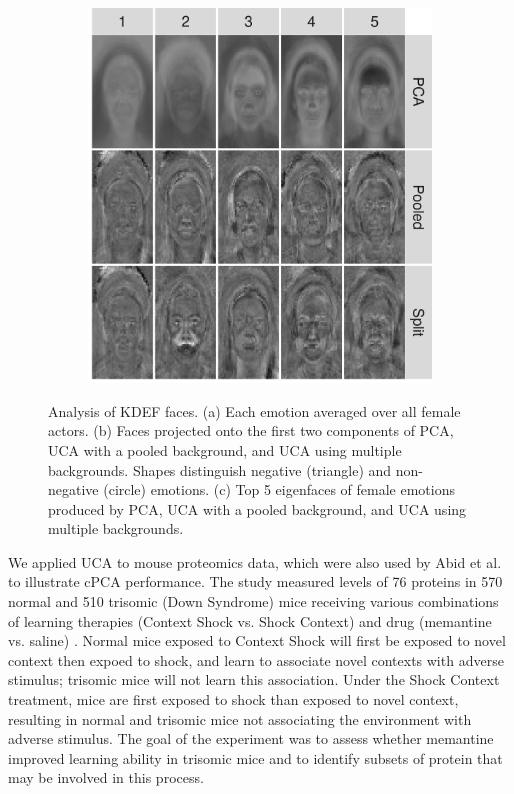 \documentclass[10pt]{article}
\begin{document}
\begin{figure}[th!]
\begin{subfigure}{.49\linewidth}
    \includegraphics[width=\textwidth]{figure/all_Afraid_removed.png}
    \caption{}
   \label{fig:faces-eigenfaces}
    \end{subfigure}
    \caption{Analysis of KDEF faces. (a) Each emotion averaged over all female actors. (b) Faces projected onto the first two components of PCA, UCA with a pooled background, and UCA using multiple backgrounds. Shapes distinguish negative (triangle) and non-negative (circle) emotions. (c) Top 5 eigenfaces of female emotions produced by PCA, UCA with a pooled background, and UCA using multiple backgrounds.}
\end{figure}

We applied UCA to mouse proteomics data, which were also used by Abid et al. \cite{Abid} to illustrate cPCA performance. The study measured levels of 76 proteins in 570 normal and 510 trisomic (Down Syndrome) mice receiving various combinations of learning therapies (Context Shock vs. Shock Context) and drug (memantine vs. saline) \cite{Ahmed, Higuera, Abid}. Normal mice exposed to Context Shock will first be exposed to novel context then expoed to shock, and learn to associate novel contexts with adverse stimulus; trisomic mice will not learn this association. Under the Shock Context treatment, mice are first exposed to shock than exposed to novel context, resulting in normal and trisomic mice not associating the environment with adverse stimulus. The goal of the experiment was to assess whether memantine improved learning ability in trisomic mice and to identify subsets of protein that may be involved in this process.
\end{document}
